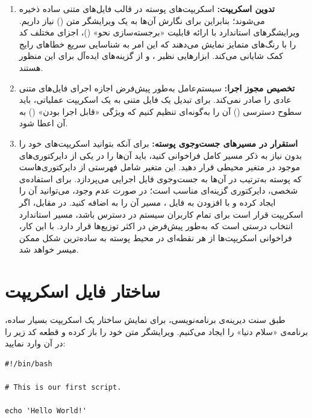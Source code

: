 \begin{enumerate}
  \item \textbf{تدوین اسکریپت:} اسکریپت‌های پوسته در قالب فایل‌های متنی ساده ذخیره می‌شوند؛ بنابراین برای نگارش آن‌ها به یک ویرایشگر متن () نیاز داریم. ویرایشگرهای استاندارد با ارائه قابلیت «برجسته‌سازی نحو» ()، اجزای مختلف کد را با رنگ‌های متمایز نمایش می‌دهند که این امر به شناسایی سریع خطاهای رایج کمک شایانی می‌کند. ابزارهایی نظیر ،  و  از گزینه‌های ایده‌آل برای این منظور هستند.

  \item \textbf{تخصیص مجوز اجرا:} سیستم‌عامل به‌طور پیش‌فرض اجازه اجرای فایل‌های متنی عادی را صادر نمی‌کند. برای تبدیل یک فایل متنی به یک اسکریپت عملیاتی، باید سطوح دسترسی () آن را به‌گونه‌ای تنظیم کنیم که ویژگی «قابل اجرا بودن» () به آن اعطا شود.

  \item \textbf{استقرار در مسیرهای جست‌وجوی پوسته:} برای آنکه بتوانید اسکریپت‌های خود را بدون نیاز به ذکر مسیر کامل فراخوانی کنید، باید آن‌ها را در یکی از دایرکتوری‌های موجود در متغیر محیطی  قرار دهید. این متغیر شامل فهرستی از دایرکتوری‌هاست که پوسته به‌ترتیب در آن‌ها به جست‌وجوی فایل اجرایی می‌پردازد. برای استفاده‌ی شخصی، دایرکتوری  گزینه‌ای مناسب است؛ در صورت عدم وجود، می‌توانید آن را ایجاد کرده و با افزودن  به فایل ، مسیر آن را به  اضافه کنید. در مقابل، اگر اسکریپت قرار است برای تمام کاربران سیستم در دسترس باشد، مسیر استاندارد  انتخاب درستی است که به‌طور پیش‌فرض در  اکثر توزیع‌ها قرار دارد. با این کار، فراخوانی اسکریپت‌ها از هر نقطه‌ای در محیط پوسته به ساده‌ترین شکل ممکن میسر خواهد شد.
\end{enumerate}

\section{ساختار فایل اسکریپت}

طبق سنت دیرینه‌ی برنامه‌نویسی، برای نمایش ساختار یک اسکریپت بسیار ساده، برنامه‌ی «سلام دنیا» را ایجاد می‌کنیم. ویرایشگر متن خود را باز کرده و قطعه کد زیر را در آن وارد نمایید:

\begin{latin}
\begin{lstlisting}
#!/bin/bash

# This is our first script.

echo 'Hello World!'
\end{lstlisting}
\end{latin}

